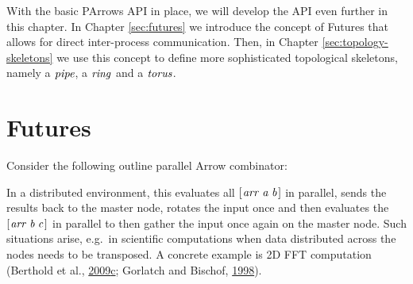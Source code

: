 \documentclass[paper=A4,twoside=true,openright,parskip=full,chapterprefix=true,headings=normal,bibliography=totoc,listof=totoc,titlepage=on,captions=tableabove,draft=false,british]{scrreprt}%
\begin{document}
With the basic PArrows API in place, we will develop the API even
further in this chapter. In Chapter \ref{sec:futures} we introduce the
concept of Futures that allows for direct inter-process communication.
Then, in Chapter \ref{sec:topology-skeletons} we use this concept to
define more sophisticated topological skeletons, namely a \ensuremath{\Varid{pipe}}, a
\ensuremath{\Varid{ring}} and a \ensuremath{\Varid{torus}}.

\hypertarget{futures}{%
\section{Futures}\label{futures}}

\label{sec:futures}

Consider the following outline parallel Arrow combinator:


\resethooks
\vspace{-2\baselineskip}

In a distributed environment, this evaluates all \ensuremath{[\mskip1.5mu \Varid{arr}\;\Varid{a}\;\Varid{b}\mskip1.5mu]} in
parallel, sends the results back to the master node, rotates the input
once and then evaluates the \ensuremath{[\mskip1.5mu \Varid{arr}\;\Varid{b}\;\Varid{c}\mskip1.5mu]} in parallel to then gather the
input once again on the master node. Such situations arise, e.g.~in
scientific computations when data distributed across the nodes needs to
be transposed. A concrete example is 2D FFT computation (Berthold et
al.,
\protect\hyperlink{ref-Berthold2009-fft}{2009}\protect\hyperlink{ref-Berthold2009-fft}{c};
Gorlatch and Bischof, \protect\hyperlink{ref-Gorlatch}{1998}).
\end{document}
